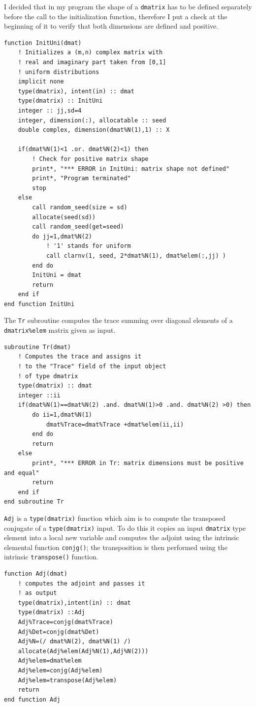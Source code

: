 \documentclass[a4paper]{article}
\begin{document}
\noindent I decided that in my program the shape of a \lstinline{dmatrix} has to be defined separately before the call to the initialization function, therefore I put a check at the beginning of it to verify that both dimensions are defined and positive.
\begin{lstlisting}
function InitUni(dmat) 
    ! Initializes a (m,n) complex matrix with 
    ! real and imaginary part taken from [0,1]
    ! uniform distributions
    implicit none
    type(dmatrix), intent(in) :: dmat
    type(dmatrix) :: InitUni
    integer :: jj,sd=4
    integer, dimension(:), allocatable :: seed
    double complex, dimension(dmat%N(1),1) :: X

    if(dmat%N(1)<1 .or. dmat%N(2)<1) then
        ! Check for positive matrix shape
        print*, "*** ERROR in InitUni: matrix shape not defined"
        print*, "Program terminated"
        stop
    else
        call random_seed(size = sd)
        allocate(seed(sd))
        call random_seed(get=seed)
        do jj=1,dmat%N(2)
            ! '1' stands for uniform
            call clarnv(1, seed, 2*dmat%N(1), dmat%elem(:,jj) )
        end do
        InitUni = dmat
        return
    end if
end function InitUni
\end{lstlisting}

The \lstinline{Tr} subroutine computes the trace summing over diagonal elements of a \lstinline{dmatrix%elem} matrix given as input.
\begin{lstlisting}
subroutine Tr(dmat)
    ! Computes the trace and assigns it
    ! to the "Trace" field of the input object
    ! of type dmatrix
    type(dmatrix) :: dmat
    integer ::ii
    if(dmat%N(1)==dmat%N(2) .and. dmat%N(1)>0 .and. dmat%N(2) >0) then
        do ii=1,dmat%N(1)
            dmat%Trace=dmat%Trace +dmat%elem(ii,ii)
        end do
        return
    else
        print*, "*** ERROR in Tr: matrix dimensions must be positive and equal"
        return
    end if
end subroutine Tr
\end{lstlisting}

\lstinline{Adj} is a \lstinline{type(dmatrix)} function which aim is to compute the transposed conjugate of a \lstinline{type(dmatrix)} input.
To do this it copies an input \lstinline{dmatrix} type element into a local new variable and computes the adjoint using the intrinsic elemental function \lstinline{conjg()}; the transposition is then performed using the intrinsic \lstinline{transpose()} function.
\begin{lstlisting}
function Adj(dmat)
    ! computes the adjoint and passes it
    ! as output
    type(dmatrix),intent(in) :: dmat
    type(dmatrix) ::Adj
    Adj%Trace=conjg(dmat%Trace)
    Adj%Det=conjg(dmat%Det)
    Adj%N=(/ dmat%N(2), dmat%N(1) /)
    allocate(Adj%elem(Adj%N(1),Adj%N(2)))
    Adj%elem=dmat%elem
    Adj%elem=conjg(Adj%elem)
    Adj%elem=transpose(Adj%elem)
    return
end function Adj
\end{lstlisting}
\end{document}
